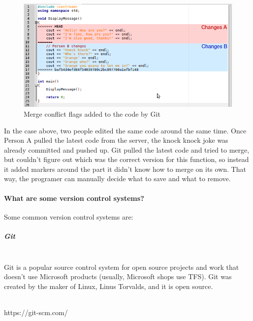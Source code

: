 \documentclass[a4paper,12pt,oneside]{book}
\begin{document}
            \begin{figure}[h]
                \centering
                \includegraphics[width=14cm]{images/merge-conflict-b.png}
                \caption{Merge conflict flags added to the code by Git}
            \end{figure}

            In the case above, two people edited the same code around
            the same time. Once Person A pulled the latest code from the
            server, the knock knock joke was already committed and pushed up.
            Git pulled the latest code and tried to merge, but couldn't figure
            out which was the correct version for this function, so instead
            it added markers around the part it didn't know how to merge
            on its own. That way, the programer can manually decide what
            to save and what to remove.

    \hrulefill

    \paragraph{What are some version control systems?}

        Some common version control systems are:

        \subparagraph{Git} ~\\

            Git is a popular source control system for open source projects
            and work that doesn't use Microsoft products (usually, Microsoft
            shops use TFS). Git was created by the maker of Linux, Linus Torvalds,
            and it is open source.

            ~\\
            https://git-scm.com/

        \newpage
\end{document}
